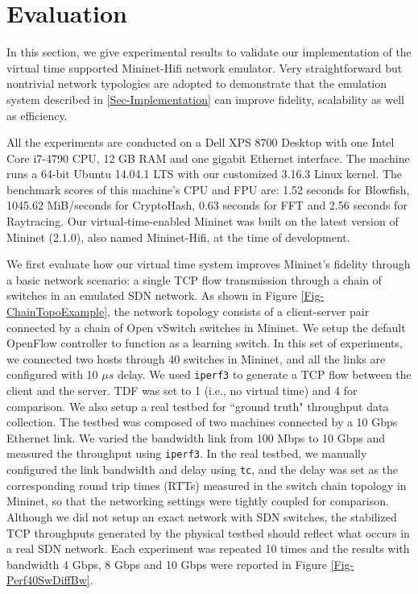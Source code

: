 \section{Evaluation}
\label{Sec-Experiments}

In this section, we give experimental results to validate our implementation of the virtual time supported Mininet-Hifi network emulator. Very straightforward but nontrivial network typologies are adopted to demonstrate that the emulation system described in \ref{Sec-Implementation} can improve fidelity, scalability as well as efficiency. 

All the experiments are conducted on a Dell XPS 8700 Desktop with one Intel Core i7-4790 CPU, 12 GB RAM and one gigabit Ethernet interface. The machine runs a 64-bit Ubuntu 14.04.1 LTS with our customized 3.16.3 Linux kernel. The benchmark scores of this machine's CPU and FPU are: 1.52 seconds for Blowfish, 1045.62 MiB/seconds for CryptoHash, 0.63 seconds for FFT and 2.56 seconds for Raytracing. Our virtual-time-enabled Mininet was built on the latest version of Mininet (2.1.0), also named Mininet-Hifi, at the time of development.

We first evaluate how our virtual time system improves Mininet's fidelity through a basic network scenario:  a single TCP flow transmission through a chain of switches in an emulated SDN network. As shown in Figure \ref{Fig-ChainTopoExample}, the network topology consists of a client-server pair connected by a chain of Open vSwitch switches in Mininet. We setup the default OpenFlow controller to function as a learning switch. In this set of experiments, we connected two hosts through 40 switches in Mininet, and all the links are configured with 10 $\mu s$ delay. We used \texttt{iperf3}\cite{iperf3} to generate a TCP flow between the client and the server. TDF was set to 1 (i.e., no virtual time) and 4 for comparison. We also setup a real testbed for ``ground truth" throughput data collection. The testbed was composed of two machines connected by a 10 Gbps Ethernet link. We varied the bandwidth link from 100 Mbps to 10 Gbps and measured the throughput using \texttt{iperf3}. In the real testbed, we manually configured the link bandwidth and delay using \texttt{tc}, and the delay was set as the corresponding round trip times (RTTs) measured in the switch chain topology in Mininet, so that the networking settings were tightly coupled for comparison. Although we did not setup an exact network with SDN switches, the stabilized TCP throughputs generated by the physical testbed should reflect what occurs in a real SDN network. Each experiment was repeated 10 times and the results with bandwidth 4 Gbps, 8 Gbps and 10 Gbps were reported in Figure \ref{Fig-Perf40SwDiffBw}. 


